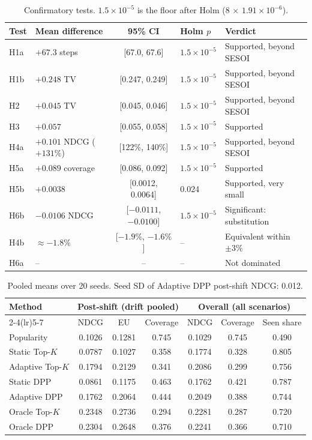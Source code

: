 \documentclass[11pt,a4paper]{article}
\begin{document}
\begin{table}[h]\centering\small
\begin{tabular}{llcll}
\toprule
Test & Mean difference & 95\% CI & Holm $p$ & Verdict \\
\midrule
H1a & $+67.3$ steps & [67.0, 67.6] & $1.5\times10^{-5}$ & Supported, beyond SESOI \\
H1b & $+0.248$ TV & [0.247, 0.249] & $1.5\times10^{-5}$ & Supported, beyond SESOI \\
H2  & $+0.045$ TV & [0.045, 0.046] & $1.5\times10^{-5}$ & Supported, beyond SESOI \\
H3  & $+0.057$ & [0.055, 0.058] & $1.5\times10^{-5}$ & Supported \\
H4a & $+0.101$ NDCG ($+131\%$) & [122\%, 140\%] & $1.5\times10^{-5}$ & Supported, beyond SESOI \\
H5a & $+0.089$ coverage & [0.086, 0.092] & $1.5\times10^{-5}$ & Supported \\
H5b & $+0.0038$ & [0.0012, 0.0064] & 0.024 & Supported, very small \\
H6b & $-0.0106$ NDCG & [$-0.0111$, $-0.0100$] & $1.5\times10^{-5}$ & Significant: substitution \\
\midrule
H4b & $\approx-1.8\%$ & [$-1.9\%$, $-1.6\%$] & -- & Equivalent within $\pm3\%$ \\
H6a & -- & -- & -- & Not dominated \\
\bottomrule
\end{tabular}
\caption{Confirmatory tests. $1.5\times10^{-5}$ is the floor after Holm (8 $\times$ $1.91\times10^{-6}$).}
\end{table}

\begin{table}[h]\centering\small
\begin{tabular}{lcccccc}
\toprule
Method & \multicolumn{3}{c}{Post-shift (drift pooled)} & \multicolumn{3}{c}{Overall (all scenarios)} \\
\cmidrule(lr){2-4}\cmidrule(lr){5-7}
 & NDCG & EU & Coverage & NDCG & Coverage & Seen share \\
\midrule
Popularity & 0.1026 & 0.1281 & 0.745 & 0.1029 & 0.745 & 0.490 \\
Static Top-$K$ & 0.0787 & 0.1027 & 0.358 & 0.1774 & 0.328 & 0.805 \\
Adaptive Top-$K$ & 0.1794 & 0.2129 & 0.341 & 0.2086 & 0.299 & 0.756 \\
Static DPP & 0.0861 & 0.1175 & 0.463 & 0.1762 & 0.421 & 0.787 \\
Adaptive DPP & 0.1762 & 0.2064 & 0.444 & 0.2049 & 0.388 & 0.744 \\
Oracle Top-$K$ & 0.2348 & 0.2736 & 0.294 & 0.2281 & 0.287 & 0.720 \\
Oracle DPP & 0.2304 & 0.2648 & 0.376 & 0.2241 & 0.366 & 0.710 \\
\bottomrule
\end{tabular}
\caption{Pooled means over 20 seeds. Seed SD of Adaptive DPP post-shift NDCG: 0.012.}
\label{tab:pooled}
\end{table}
\end{document}
